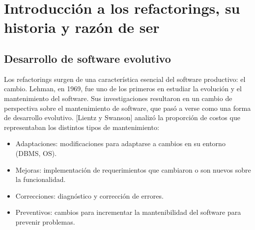 \section{Introducción a los refactorings, su historia y razón de ser}

\subsection{Desarrollo de software evolutivo}
Los refactorings surgen de una característica esencial del software productivo:
el cambio.  Lehman, en 1969, fue uno de los primeros en estudiar la evolución y
el mantenimiento del software. Sus investigaciones resultaron en un cambio de
perspectiva sobre el mantenimiento de software, que pasó a verse como una forma
de desarrollo evolutivo.
[Lientz y Swanson] analizó la proporción de costos que representaban los
distintos tipos de mantenimiento:

\begin{itemize}
    \item Adaptaciones: modificaciones para adaptarse a cambios en su entorno
      (DBMS, OS).
    \item Mejoras: implementación de requerimientos que cambiaron o son nuevos
      sobre la funcionalidad.
    \item Correcciones: diagnóstico y corrección de errores.
    \item Preventivos: cambios para incrementar la mantenibilidad del software
      para prevenir problemas.
\end{itemize}


